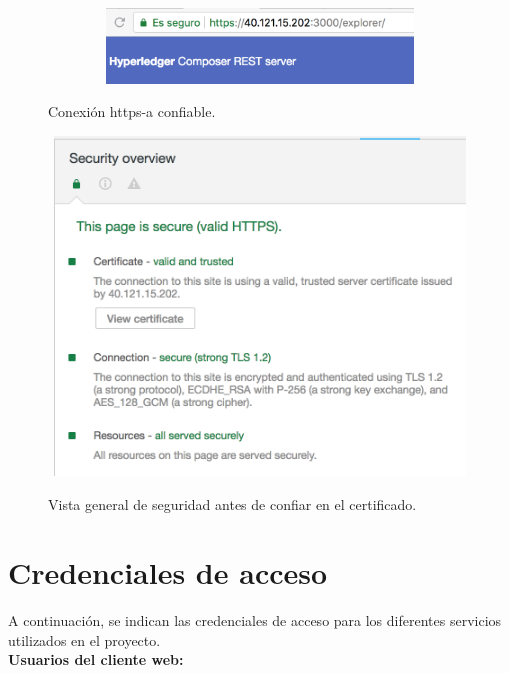 \documentclass[12pt,a4paper, twoside]{report}
\begin{document}
		\begin{figure}[!ht]   
			\caption{Conexión \gls{https-a} confiable.} 
			\begin{center} 
	 			\includegraphics[width=12cm,height=2cm]{Images/installationManual/https/httpsTrusted.png} \\
			\label{fig:https_httpsTrusted} 
			\end{center}  
		\end{figure}
		
		\begin{figure}[!ht]   
			\caption{Vista general de seguridad antes de confiar en el certificado.} 
			\begin{center} 
	 			\includegraphics[width=12cm,height=9cm]{Images/installationManual/https/overviewAfter.png} \\
			\label{fig:https_overviewAfter} 
			\end{center}  
		\end{figure}
		 	
	\section{Credenciales de acceso}\label{credenciales}
	
	A continuación, se indican las credenciales de acceso para los diferentes servicios utilizados en el proyecto. \\
		
	\textbf{Usuarios del cliente web:}
	
\end{document}
